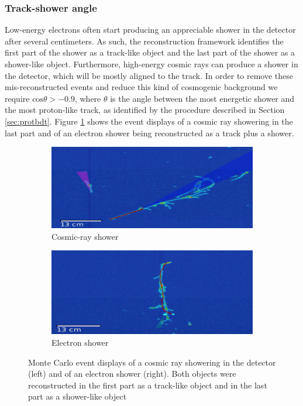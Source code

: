\subsubsection{Track-shower angle}
Low-energy electrons often start producing an appreciable shower in the detector after several centimeters. As such, the reconstruction framework identifies the first part of the shower as a track-like object and the last part of the shower as a shower-like object. 
Furthermore, high-energy cosmic rays can produce a shower in the detector, which will be mostly aligned to the track. In order to remove these mis-reconstructed events and reduce this kind of cosmogenic background we require $\mathrm{cos}\theta > -0.9$, where $\theta$ is the angle between the most energetic shower and the most proton-like track, as identified by the procedure described in Section \ref{sec:protbdt}.
Figure \ref{fig:angle} shows the event displays of a cosmic ray showering in the last part and of an electron shower being reconstructed as a track plus a shower.

\begin{figure}[htbp]
\centering
  \begin{subfigure}{0.45\textwidth}
    \includegraphics[width=\linewidth]{figures/angle1.png}
    \caption{Cosmic-ray shower} 
  \end{subfigure}
    \begin{subfigure}{0.45\textwidth}
    \includegraphics[width=\linewidth]{figures/angle2.png}
    \caption{Electron shower} 
  \end{subfigure}
  \caption{Monte Carlo event displays of a cosmic ray showering in the detector (left) and of an electron shower (right). Both objects were reconstructed in the first part as a track-like object and in the last part as a shower-like object}\label{fig:angle}
\end{figure}


